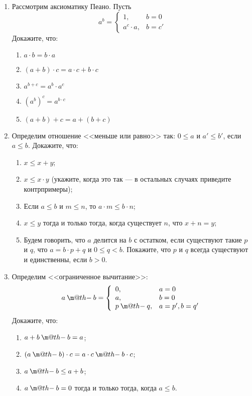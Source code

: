 \documentclass[10pt,a4paper,oneside]{article}
\makeatletter
\newcommand{\dotminus}{\mathbin{\text{\@dotminus}}}
\newcommand{\@dotminus}{%
  \ooalign{\hidewidth\raise1ex\hbox{.}\hidewidth\cr$\m@th-$\cr}%
}
\makeatother
\begin{document}
\begin{enumerate}
\item Рассмотрим аксиоматику Пеано. 
Пусть $$a^b = \left\{\begin{array}{ll}1,& b= 0 \\a^c\cdot a,&b = c'\end{array}\right.$$
Докажите, что:
\begin{enumerate}
\item $a \cdot b = b \cdot a$
\item $(a + b) \cdot c = a \cdot c + b \cdot c$
\item $a^{b+c} = a^b \cdot a^c$
\item $(a^b)^c = a^{b \cdot c}$
\item $(a + b) + c = a + (b + c)$
\end{enumerate}

\item Определим отношение <<меньше или равно>> так: $0 \le a$ и $a' \le b'$, если $a \le b$. Докажите, что:
\begin{enumerate}
\item $x \le x+y$;
\item $x \le x \cdot y$ (укажите, когда это так --- в остальных случаях приведите контрпримеры);
\item Если $a \le b$ и $m \le n$, то $a \cdot m \le b \cdot n$;
\item $x \le y$ тогда и только тогда, когда существует $n$, что $x + n = y$;
\item Будем говорить, что $a$ делится на $b$ с остатком, если существуют такие $p$ и $q$, что 
$a = b \cdot p + q$ и $0 \le q < b$. Покажите, что $p$ и $q$ всегда существуют и единственны,
если $b > 0$.
\end{enumerate}

\item Определим <<ограниченное вычитание>>: $$a \dotminus b = \left\{\begin{array}{ll}0, & a = 0\\a, & b = 0\\p \dotminus q, & a = p', b = q'\end{array}\right.$$
Докажите, что:
\begin{enumerate}
\item $a + b \dotminus b = a$;
\item $(a \dotminus b) \cdot c = a \cdot c \dotminus b \cdot c$;
\item $a \dotminus b \le a + b$;
\item $a \dotminus b = 0$ тогда и только тогда, когда $a \le b$.
\end{enumerate}


\end{enumerate}
\end{document}
